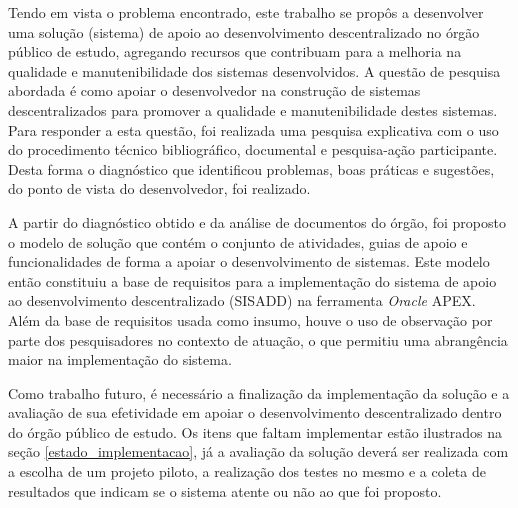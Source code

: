 Tendo em vista o problema encontrado, este trabalho se propôs a desenvolver uma solução (sistema) de apoio ao desenvolvimento descentralizado no órgão público de estudo, agregando recursos que contribuam para a melhoria na qualidade e manutenibilidade dos sistemas desenvolvidos. A questão de pesquisa abordada é como apoiar o desenvolvedor na construção de sistemas descentralizados para promover a qualidade e manutenibilidade destes sistemas. Para responder a esta questão, foi realizada uma pesquisa explicativa com o uso do procedimento técnico bibliográfico, documental e pesquisa-ação participante. Desta forma o diagnóstico que identificou problemas, boas práticas e sugestões, do ponto de vista do desenvolvedor, foi realizado.

A partir do diagnóstico obtido e da análise de documentos do órgão, foi proposto o modelo de solução que contém o conjunto de atividades, guias de apoio e funcionalidades de forma a apoiar o desenvolvimento de sistemas. Este modelo então constituiu a base de requisitos para a implementação do sistema de apoio ao desenvolvimento descentralizado (SISADD) na ferramenta \textit{Oracle} APEX. Além da base de requisitos usada como insumo, houve o uso de observação por parte dos pesquisadores no contexto de atuação, o que permitiu uma abrangência maior na implementação do sistema.

Como trabalho futuro, é necessário a finalização da implementação da solução e a avaliação de sua efetividade em apoiar o desenvolvimento descentralizado dentro do órgão público de estudo. Os itens que faltam implementar estão ilustrados na seção \ref{estado_implementacao}, já a avaliação da solução deverá ser realizada com a escolha de um projeto piloto, a realização dos testes no mesmo e a coleta de resultados que indicam se o sistema atente ou não ao que foi proposto.